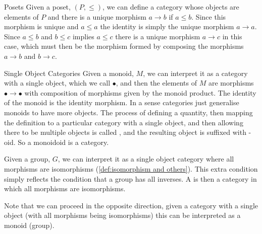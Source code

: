 \documentclass[fleqn]{NotesClass}
\begin{document}
    \begin{exm}{Posets}{}
        Given a poset, \((P, \le)\), we can define a category whose objects are elements of \(P\) and there is a unique morphism \(a \to b\) if \(a \le b\).
        Since this morphism is unique and \(a \le a\) the identity is simply the unique morphism \(a \to a\).
        Since \(a \le b\) and \(b \le c\) implies \(a \le c\) there is a unique morphism \(a \to c\) in this case, which must then be the morphism formed by composing the morphisms \(a \to b\) and \(b \to c\).
    \end{exm}
    
    \begin{exm}{Single Object Categories}{}
        Given a monoid, \(M\), we can interpret it as a category with a single object, which we call \(\bullet\), and then the elements of \(M\) are morphisms \(\bullet \to \bullet\) with composition of morphisms given by the monoid product.
        The identity of the monoid is the identity morphism.
        In a sense categories just generalise monoids to have more objects.
        The process of defining a quantity, then mapping the definition to a particular category with a single object, and then allowing there to be multiple objects is called , and the resulting object is suffixed with -oid.
        So a monoidoid is a category.
        
        Given a group, \(G\), we can interpret it as a single object category where all morphisms are isomorphisms (\cref{def:isomorphism and others}).
        This extra condition simply reflects the condition that a group has all inverses.
        A  is then a category in which all morphisms are isomorphisms.
        
        Note that we can proceed in the opposite direction, given a category with a single object (with all morphisms being isomorphisms) this can be interpreted as a monoid (group).
    \end{exm}
    
\end{document}
